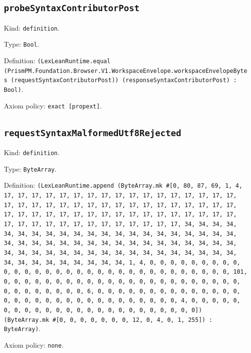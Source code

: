 \documentclass[11pt]{article}
\begin{document}
\subsection*{\texttt{probeSyntaxContributorPost}}
\noindent Kind: \texttt{definition}.\par
\noindent Type: \texttt{Bool}.\par
\noindent Definition: \texttt{(LexLeanRuntime.equal (PrismPM.Foundation.Browser.V1.WorkspaceEnvelope.workspaceEnvelopeBytes (requestSyntaxContributorPost)) (responseSyntaxContributorPost) : Bool)}.\par
\noindent Axiom policy: \texttt{exact [propext]}.\par
\subsection*{\texttt{requestSyntaxMalformedUtf8Rejected}}
\noindent Kind: \texttt{definition}.\par
\noindent Type: \texttt{ByteArray}.\par
\noindent Definition: \texttt{(LexLeanRuntime.append (ByteArray.mk \#[0, 80, 87, 69, 1, 4, 17, 17, 17, 17, 17, 17, 17, 17, 17, 17, 17, 17, 17, 17, 17, 17, 17, 17, 17, 17, 17, 17, 17, 17, 17, 17, 17, 17, 17, 17, 17, 17, 17, 17, 17, 17, 17, 17, 17, 17, 17, 17, 17, 17, 17, 17, 17, 17, 17, 17, 17, 17, 17, 17, 17, 17, 17, 17, 17, 17, 17, 17, 17, 17, 34, 34, 34, 34, 34, 34, 34, 34, 34, 34, 34, 34, 34, 34, 34, 34, 34, 34, 34, 34, 34, 34, 34, 34, 34, 34, 34, 34, 34, 34, 34, 34, 34, 34, 34, 34, 34, 34, 34, 34, 34, 34, 34, 34, 34, 34, 34, 34, 34, 34, 34, 34, 34, 34, 34, 34, 34, 34, 34, 34, 34, 34, 34, 34, 1, 4, 0, 0, 0, 0, 0, 0, 0, 0, 0, 0, 0, 0, 0, 0, 0, 0, 0, 0, 0, 0, 0, 0, 0, 0, 0, 0, 0, 0, 0, 0, 0, 101, 0, 0, 0, 0, 0, 0, 0, 0, 0, 0, 0, 0, 0, 0, 0, 0, 0, 0, 0, 0, 0, 0, 0, 0, 0, 0, 0, 0, 0, 0, 0, 6, 0, 0, 0, 0, 0, 0, 0, 0, 0, 0, 0, 0, 0, 0, 0, 0, 0, 0, 0, 0, 0, 0, 0, 0, 0, 0, 0, 0, 0, 0, 0, 4, 0, 0, 0, 0, 0, 0, 0, 0, 0, 0, 0, 0, 0, 0, 0, 0, 0, 0, 0, 0, 0, 0, 0, 0]) (ByteArray.mk \#[0, 0, 0, 0, 0, 0, 0, 12, 0, 4, 0, 1, 255]) : ByteArray)}.\par
\noindent Axiom policy: \texttt{none}.\par
\end{document}
